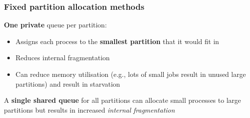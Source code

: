 \documentclass{article}
\begin{document}
\subsubsection{Fixed partition allocation methods}
\begin{flushleft}
\textbf{One private} queue per partition:
\begin{itemize}
	\item Assigns each process to the \textbf{smallest partition} that it would fit in
	\item Reduces internal fragmentation
	\item Can reduce memory utilisation (e.g., lots of small jobs result in unused large partitions) and result in starvation 
\end{itemize}
A \textbf{single shared queue} for all partitions can allocate small processes to large partitions but results in increased \textit{internal fragmentation}
\end{flushleft}
\end{document}
